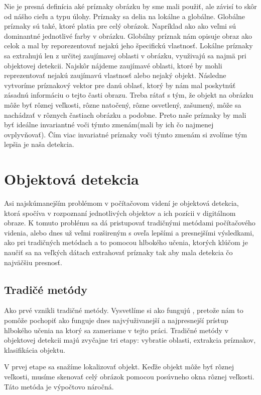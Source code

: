 Nie je presná definícia aké príznaky obrázku by sme mali použiť, ale závisí to skôr od nášho cieľu a typu úlohy. Príznaky sa delia na lokálne a globálne. Globálne príznaky sú také, ktoré platia pre celý obrázok. Napríklad ako ako veľmi sú dominantné jednotlivé farby v obrázku. Globálny príznak nám opisuje obraz ako celok a mal by reporezentovať nejakú jeho špecifickú vlastnosť. Lokálne príznaky sa extrahujú len z určitej zaujímavej oblasti v obrázku, využivajú sa najmä pri objektovej detekcii. Najskôr nájdeme zaujímavé oblasti, ktoré by mohli reprezentovať nejakú zaujímavú vlastnosť alebo nejaký objekt. Následne vytvoríme príznakový vektor pre danú oblasť, ktorý by nám mal poskytnúť zásadnú informáciu o tejto časti obrazu. Treba rátať s tým, že objekt na obrázku môže byť rôznej veľkosti, rôzne natočený, rôzne osvetlený, zašumený, môže sa nachádzať v rôznych častiach obrázku a podobne. Preto naše príznaky by mali byť ideálne invariantné voči týmto zmenám(mali by ich čo najmenej ovplyvňovať). Čím viac invariatné príznaky voči týmto zmenám si zvolíme tým lepšia je naša detekcia. 

\section{Objektová detekcia}

\hspace{\parindent}Asi najskúmanejším problémom v počítačovom videní je objektová detekcia, ktorá spočíva v rozpoznaní jednotlivých objektov a ich pozícii v digitálnom obraze. K tomuto problému sa dá pristupovať tradičnými metódami počítačového videnia, alebo dnes už veľmi rozšireným s oveľa lepšími a presnejšími výsledkami, ako pri tradičných metódach a to pomocou hlbokého učenia, ktorých klúčom je naučiť sa na veľkých dátach extrahovať príznaky tak aby mala detekcia čo najväčšiu presnosť.

\subsection{Tradičé metódy}
\hspace{\parindent}Ako prvé vznikli tradičné metódy. Vysvetlíme si ako fungujú , pretože nám to pomôže pochopiť ako funguje dnes najvýuživanejší a najpresnejší prístup hlbokého učenia na ktorý sa zameriame v tejto práci. Tradičné metódy v objektovej detekcii majú zvyčajne tri etapy: vybratie oblasti, extrakcia príznakov, klasifikácia objektu. 

V prvej etape sa snažíme lokalizovať objekt. Keďže objekt môže byť rôznej veľkosti, musíme skenovať celý obrázok pomocou posúvneho okna rôznej veľkosti. Táto metóda je výpočtovo náročná. 

